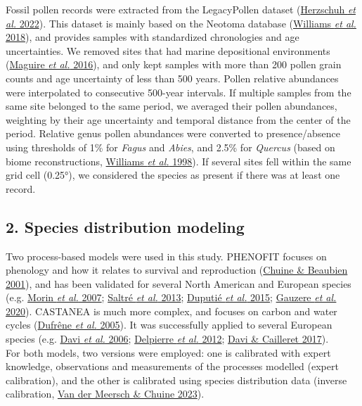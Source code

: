 \documentclass[11pt,]{article}
\begin{document}
Fossil pollen records were extracted from the LegacyPollen dataset
(\protect\hyperlink{ref-Herzschuh2022}{Herzschuh \emph{et al.} 2022}).
This dataset is mainly based on the Neotoma database
(\protect\hyperlink{ref-Williams2018}{Williams \emph{et al.} 2018}), and
provides samples with standardized chronologies and age uncertainties.
We removed sites that had marine depositional environments
(\protect\hyperlink{ref-Maguire2016}{Maguire \emph{et al.} 2016}), and
only kept samples with more than 200 pollen grain counts and age
uncertainty of less than 500 years. Pollen relative abundances were
interpolated to consecutive 500-year intervals. If multiple samples from
the same site belonged to the same period, we averaged their pollen
abundances, weighting by their age uncertainty and temporal distance
from the center of the period. Relative genus pollen abundances were
converted to presence/absence using thresholds of 1\% for \emph{Fagus}
and \emph{Abies}, and 2.5\% for \emph{Quercus} (based on biome
reconstructions, \protect\hyperlink{ref-Williams1998}{Williams \emph{et
al.} 1998}). If several sites fell within the same grid cell (0.25°), we
considered the species as present if there was at least one record.

\hypertarget{species-distribution-modeling}{%
\subsection{2. Species distribution
modeling}\label{species-distribution-modeling}}

Two process-based models were used in this study. PHENOFIT focuses on
phenology and how it relates to survival and reproduction
(\protect\hyperlink{ref-Chuine2001}{Chuine \& Beaubien 2001}), and has
been validated for several North American and European species (e.g.
\protect\hyperlink{ref-Morin2007}{Morin \emph{et al.} 2007};
\protect\hyperlink{ref-Saltre2013}{Saltré \emph{et al.} 2013};
\protect\hyperlink{ref-Duputie2015}{Duputié \emph{et al.} 2015};
\protect\hyperlink{ref-Gauzere2020}{Gauzere \emph{et al.} 2020}).
CASTANEA is much more complex, and focuses on carbon and water cycles
(\protect\hyperlink{ref-Dufrene2005}{Dufrêne \emph{et al.} 2005}). It
was successfully applied to several European species (e.g.
\protect\hyperlink{ref-Davi2006}{Davi \emph{et al.} 2006};
\protect\hyperlink{ref-Delpierre2012}{Delpierre \emph{et al.} 2012};
\protect\hyperlink{ref-Davi2017}{Davi \& Cailleret 2017}).\\
For both models, two versions were employed: one is calibrated with
expert knowledge, observations and measurements of the processes
modelled (expert calibration), and the other is calibrated using species
distribution data (inverse calibration,
\protect\hyperlink{ref-VanderMeersch2023}{Van der Meersch \& Chuine
2023}).
\end{document}
